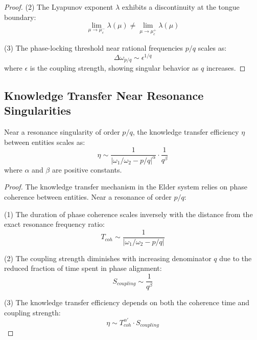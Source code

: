 \begin{definition}
\begin{enumerate}
\begin{proof}
(2) The Lyapunov exponent $\lambda$ exhibits a discontinuity at the tongue boundary:
\begin{equation}
\lim_{\mu \to \mu_c^-} \lambda(\mu) \neq \lim_{\mu \to \mu_c^+} \lambda(\mu)
\end{equation}

(3) The phase-locking threshold near rational frequencies $p/q$ scales as:
\begin{equation}
\Delta \omega_{p/q} \sim \epsilon^{1/q}
\end{equation}
where $\epsilon$ is the coupling strength, showing singular behavior as $q$ increases.
\end{proof}

\subsection{Knowledge Transfer Near Resonance Singularities}

\begin{theorem}
Near a resonance singularity of order $p/q$, the knowledge transfer efficiency $\eta$ between entities scales as:
\begin{equation}
\eta \sim \frac{1}{|\omega_1/\omega_2 - p/q|^\alpha} \cdot \frac{1}{q^\beta}
\end{equation}
where $\alpha$ and $\beta$ are positive constants.
\end{theorem}

\begin{proof}
The knowledge transfer mechanism in the Elder system relies on phase coherence between entities. Near a resonance of order $p/q$:

(1) The duration of phase coherence scales inversely with the distance from the exact resonance frequency ratio:
\begin{equation}
T_{coh} \sim \frac{1}{|\omega_1/\omega_2 - p/q|}
\end{equation}

(2) The coupling strength diminishes with increasing denominator $q$ due to the reduced fraction of time spent in phase alignment:
\begin{equation}
S_{coupling} \sim \frac{1}{q^{\beta}}
\end{equation}

(3) The knowledge transfer efficiency depends on both the coherence time and coupling strength:
\begin{equation}
\eta \sim T_{coh}^{\alpha'} \cdot S_{coupling}
\end{equation}


\end{proof}
\end{enumerate}
\end{definition}
